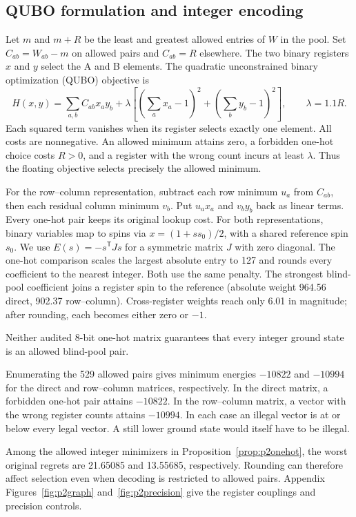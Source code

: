 \subsection{QUBO formulation and integer encoding}\label{sec:p2encoding}
Let $m$ and $m+R$ be the least and greatest allowed entries of $W$ in the pool. Set $C_{ab}=W_{ab}-m$ on allowed pairs and $C_{ab}=R$ elsewhere. The two binary registers $x$ and $y$ select the A and B elements. The quadratic unconstrained binary optimization (QUBO) objective is
\begin{equation}
 H(x,y)=\sum_{a,b} C_{ab}x_a y_b+
 \lambda\left[\left(\sum_a x_a-1\right)^2+
                 \left(\sum_b y_b-1\right)^2\right],\qquad \lambda=1.1R .
 \label{eq:p2qubo}
\end{equation}\nopagebreak[4]
\noindent Each squared term vanishes when its register selects exactly one element. All costs are nonnegative. An allowed minimum attains zero, a forbidden one-hot choice costs $R>0$, and a register with the wrong count incurs at least $\lambda$. Thus the floating objective selects precisely the allowed minimum.

For the row--column representation, subtract each row minimum $u_a$ from $C_{ab}$, then each residual column minimum $v_b$. Put $u_a x_a$ and $v_b y_b$ back as linear terms. Every one-hot pair keeps its original lookup cost. For both representations, binary variables map to spins via $x=(1+s s_0)/2$, with a shared reference spin $s_0$. We use $E(s)=-s^{\mathsf T}Js$ for a symmetric matrix $J$ with zero diagonal. The one-hot comparison scales the largest absolute entry to 127 and rounds every coefficient to the nearest integer. Both use the same penalty. The strongest blind-pool coefficient joins a register spin to the reference (absolute weight 964.56 direct, 902.37 row--column). Cross-register weights reach only 6.01 in magnitude; after rounding, each becomes either zero or $-1$.

\begin{proposition}\label{prop:p2onehot}
Neither audited 8-bit one-hot matrix guarantees that every integer ground state is an allowed blind-pool pair.
\end{proposition}
\begin{p1proof}
Enumerating the 529 allowed pairs gives minimum energies $-10822$ and $-10994$ for the direct and row--column matrices, respectively. In the direct matrix, a forbidden one-hot pair attains $-10822$. In the row--column matrix, a vector with the wrong register counts attains $-10994$. In each case an illegal vector is at or below every legal vector. A still lower ground state would itself have to be illegal.
\end{p1proof}
Among the allowed integer minimizers in Proposition~\ref{prop:p2onehot}, the worst original regrets are 21.65085 and 13.55685, respectively. Rounding can therefore affect selection even when decoding is restricted to allowed pairs. Appendix Figures~\ref{fig:p2graph} and~\ref{fig:p2precision} give the register couplings and precision controls.

